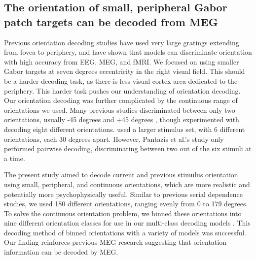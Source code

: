 \documentclass[../main.tex]{subfiles}
\begin{document}
\subsection*{The orientation of small, peripheral Gabor patch targets can be decoded from MEG}
Previous orientation decoding studies \citep{haynes_rees_2005, kamitani_tong_2005, GARCIA2013515, cichy_ramirez_pantazis_2015, pantazis_fang_qin_mohsenzadeh_li_cichy_2018} have used very large gratings extending from fovea to periphery, and have shown that models can discriminate orientation with high accuracy from EEG, MEG, and fMRI. We focused on using smaller Gabor targets at seven degrees eccentricity in the right visual field. This should be a harder decoding task, as there is less visual cortex area dedicated to the periphery. This harder task pushes our understanding of orientation decoding. Our orientation decoding was further complicated by the continuous range of orientations we used. Many previous studies discriminated between only two orientations, usually -45 degrees and +45 degrees \citep{haynes_rees_2005, cichy_ramirez_pantazis_2015, GARCIA2013515}, though \cite{kamitani_tong_2005} experimented with decoding eight different orientations. \cite{pantazis_fang_qin_mohsenzadeh_li_cichy_2018} used a larger stimulus set, with 6 different orientations, each 30 degrees apart. However, Pantazis et al.'s study only performed pairwise decoding, discriminating between two out of the six stimuli at a time. 

The present study aimed to decode current and previous stimulus orientation using small, peripheral, and continuous orientations, which are more realistic and potentially more psychophysically useful. Similar to previous serial dependence studies, we used 180 different orientations, ranging evenly from 0 to 179 degrees. To solve the continuous orientation problem, we binned these orientations into nine different orientation classes for use in our multi-class decoding models \citep{haynes_rees_2005, Brouwer09, Brouwer, GARCIA2013515, cichy_ramirez_pantazis_2015}. This decoding method of binned orientations with a variety of models was successful. Our finding reinforces previous MEG research \citep{cichy_ramirez_pantazis_2015, pantazis_fang_qin_mohsenzadeh_li_cichy_2018} suggesting that orientation information can be decoded by MEG. 
\end{document}
